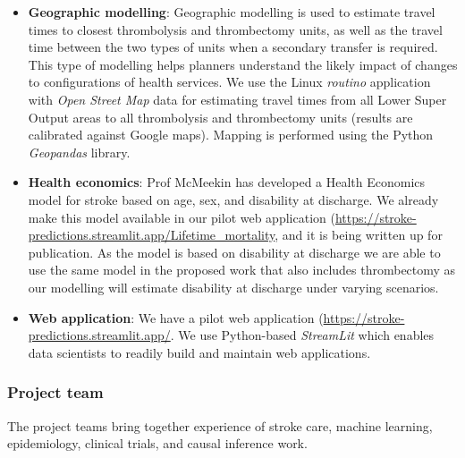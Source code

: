 \begin{itemize}
    \item \textbf{Geographic modelling}: Geographic modelling is used to estimate travel times to closest thrombolysis and thrombectomy units, as well as the travel time between the two types of units when a secondary transfer is required. This type of modelling helps planners understand the likely impact of changes to configurations of health services. We use the Linux \textit{routino} application with \textit{Open Street Map} data for estimating travel times from all Lower Super Output areas to all thrombolysis and thrombectomy units (results are calibrated against Google maps). Mapping is performed using the Python \textit{Geopandas} library.

    \item \textbf{Health economics}: Prof McMeekin has developed a Health Economics model for stroke based on age, sex, and disability at discharge. We already make this model available in our pilot web application (\url{https://stroke-predictions.streamlit.app/Lifetime_mortality}, and it is being written up for publication. As the model is based on disability at discharge we are able to use the same model in the proposed work that also includes thrombectomy as our modelling will estimate disability at discharge under varying scenarios.

    \item \textbf{Web application}: We have a pilot web application (\url{https://stroke-predictions.streamlit.app/}. We use Python-based \textit{StreamLit} which enables data scientists to readily build and maintain web applications.
    
\end{itemize}


\subsubsection{Project team}

The project teams bring together experience of stroke care, machine learning, epidemiology, clinical trials, and causal inference work.


